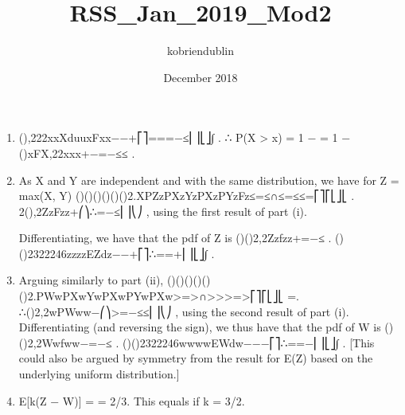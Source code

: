 \documentclass{article}
\title{RSS_Jan_2019_Mod2}
\author{kobriendublin }
\date{December 2018}
\begin{document}



\begin{enumerate}
    \item (),222xxXduuxFxx\theta\theta\theta\theta\theta\theta\theta\theta−−+⎡⎤===−≤⎢⎥⎣⎦∫ .
∴ P(X > x) = 1 − = 1 − ()xFX,22xxx\theta\theta\theta\theta\theta\theta+−=−≤≤ .
    \item As X and Y are independent and with the same distribution, we have for Z = max(X, Y)
()()()()()()2.XPZzPXzYzPXzPYzFz≤=≤∩≤=≤≤=⎡⎤⎡⎣⎦⎣ .
2(),2ZzFzz\theta\theta\theta\theta+⎛⎞∴=−≤⎜⎟⎝⎠ , using the first result of part (i).

Differentiating, we have that the pdf of Z is
()()2,2Zzfzz\theta\theta\theta\theta+=−≤ .
()()2322246zzzzEZdz\theta\theta\theta\theta\theta \theta\theta\theta\theta−−+⎡⎤∴==+⎢⎥⎣⎦∫ .
    \item  Arguing similarly to part (ii),
()()()()()()2.PWwPXwYwPXwPYwPXw>=>∩>>>=>⎡⎤⎡⎣⎦⎣ =.
∴()2,2wPWww\theta\theta\theta\theta−⎛⎞>=−≤≤⎜⎟⎝⎠ , using the second result of part (i).
Differentiating (and reversing the sign), we thus have that the pdf of W is
()()2,2Wwfww\theta\theta\theta\theta−=−≤ .
()()2322246wwwwEWdw\theta\theta\theta\theta\theta \theta\theta\theta\theta−−−⎡⎤∴==−⎢⎥⎣⎦∫
.
[This could also be argued by symmetry from the result for E(Z) based on the underlying uniform distribution.]
    \item  E[k(Z − W)] = \thetak[⅓ + ⅓] = 2\thetak/3. This equals \theta if k = 3/2.
\end{enumerate}
\end{document}
